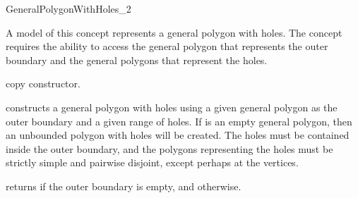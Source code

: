 \ccRefPageBegin
 
\def\ccLongParamLayout{\ccFalse}
\begin{ccRefConcept}{GeneralPolygonWithHoles_2}


\ccRefines

\ccTypes
\ccThreeToTwo




\ccDefinition
A model of this concept represents a general polygon with holes. The
concept requires the ability to access the general polygon that
represents the outer boundary and the general polygons that represent
the holes.

\ccThreeToTwo

\ccCreation
{}

\ccGlue
{}
{copy constructor.}
\ccGlue
{}

{constructs a general polygon with holes using a given general polygon 
as the outer boundary and a given range of holes. If  is an empty
general polygon, then an unbounded polygon with holes will be created. The holes must be
contained inside the outer boundary, and the polygons representing the holes 
must be strictly simple and pairwise disjoint, except perhaps at the vertices.}

\ccPredicates
{returns  if the outer boundary is empty, and 
otherwise.}

\ccAccessFunctions


\end{ccRefConcept}
